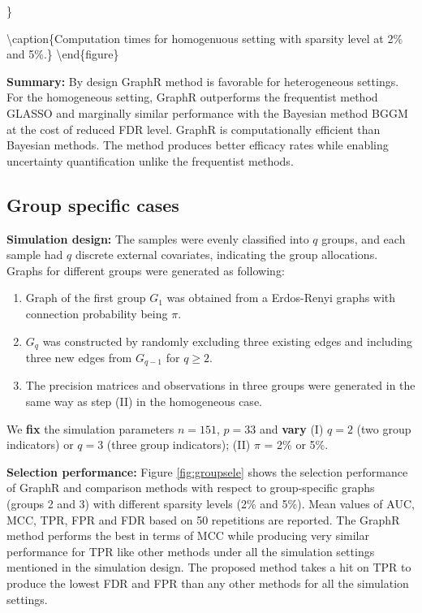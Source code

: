 \documentclass[
]{book}
\begin{document}
\}

\textbackslash caption\{Computation times for homogenuous setting with sparsity level at 2\% and 5\%.\}\label{fig:homotime}
\textbackslash end\{figure\}

\textbf{Summary:} By design GraphR method is favorable for heterogeneous settings. For the homogeneous setting, GraphR outperforms the frequentist method GLASSO and marginally similar performance with the Bayesian method BGGM at the cost of reduced FDR level. GraphR is computationally efficient than Bayesian methods. The method produces better efficacy rates while enabling uncertainty quantification unlike the frequentist methods.

\hypertarget{simgroupspec}{%
\subsection{Group specific cases}\label{simgroupspec}}

\textbf{Simulation design:}
The samples were evenly classified into \(q\) groups, and each sample had \(q\) discrete external covariates, indicating the group allocations. Graphs for different groups were generated as following:

\begin{enumerate}
\def\labelenumi{(\Roman{enumi})}
\item
  Graph of the first group \(G_1\) was obtained from a Erdos-Renyi graphs with connection probability being \(\pi\).
\item
  \(G_q\) was constructed by randomly excluding three existing edges and including three new edges from \(G_{q-1}\) for \(q \geq 2\).
\item
  The precision matrices and observations in three groups were generated in the same way as step (II) in the homogeneous case.
\end{enumerate}

We \textbf{fix} the simulation parameters \(n = 151\), \(p = 33\) and \textbf{vary} (I) \(q = 2\) (two group indicators) or \(q = 3\) (three group indicators); (II) \(\pi\) = 2\% or 5\%.

\textbf{Selection performance:}
Figure \ref{fig:groupsele} shows the selection performance of GraphR and comparison methods with respect to group-specific graphs (groups 2 and 3) with different sparsity levels (2\% and 5\%). Mean values of AUC, MCC, TPR, FPR and FDR based on 50 repetitions are reported. The GraphR method performs the best in terms of MCC while producing very similar performance for TPR like other methods under all the simulation settings mentioned in the simulation design. The proposed method takes a hit on TPR to produce the lowest FDR and FPR than any other methods for all the simulation settings.
\end{document}
